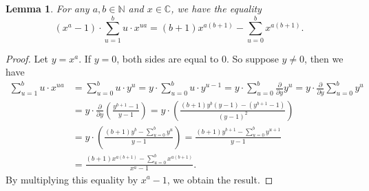 \documentclass[12pt,a4paper]{article}
\newtheorem{lemma}[theorem]{Lemma}
\theoremstyle{definition}
\newcommand{\Nbb}{\mathbb{N}}
\newcommand{\C}{\mathbb{C}}
\begin{document}
\begin{lemma}\label{argeo}
For any $a,b\in\Nbb$ and $x\in\C$, we have the equality
$$(x^a-1)\cdot\sum_{u=1}^{b}u\cdot x^{ua}=(b+1)x^{a(b+1)}-\sum_{u=0}^b x^{a(b+1)}.$$
\end{lemma}
\begin{proof}
Let $y=x^a$. If $y=0$, both sides are equal to $0$. So suppose $y\neq 0$, then we have 
\begin{align*}
\sum_{u=1}^{b}u\cdot x^{ua}&=\sum_{u=0}^{b}u\cdot y^{u}=y\cdot \sum_{u=0}^{b}u\cdot y^{u-1}=y\cdot \sum_{u=0}^{b}\frac{\partial}{\partial y} y^u=y\cdot \frac{\partial}{\partial y}\sum_{u=0}^{b} y^u\\
&=y\cdot \frac{\partial}{\partial y} \left(\frac{y^{b+1}-1}{y-1}\right)=y\cdot \left(\frac{(b+1)y^{b}(y-1)-(y^{b+1}-1)}{(y-1)^2}\right)\\
&=y\cdot \left(\frac{(b+1)y^{b}-\sum_{u=0}^b y^u}{y-1}\right)=\frac{(b+1)y^{b+1}-\sum_{u=0}^b y^{u+1}}{y-1}\\
&=\frac{(b+1)x^{a(b+1)}-\sum_{u=0}^b x^{a(b+1)}}{x^a-1}.
\end{align*}
By multiplying this equality by $x^a-1$, we obtain the result.
\end{proof}
\end{document}
